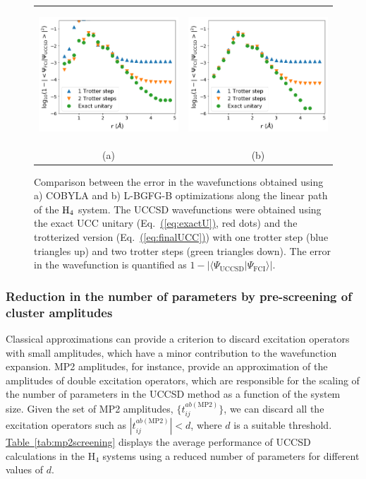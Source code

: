 \documentclass[superscriptaddress,aps,pra,twocolumn,nofootinbib,babel]{revtex4-1}
\newcommand{\eq}[1]{Eq.~\hyperref[eq:#1]{(\ref*{eq:#1})}}
\newcommand{\tab}[1]{\hyperref[tab:#1]{Table~\ref*{tab:#1}}}
\begin{document}
\begin{figure}
\centering
\begin{tabular}{cc}  \includegraphics[height=5cm]{figures/Linear-Trotter-COBYLA.png} & \includegraphics[height=5cm]{figures/Linear-Trotter-LBFGS.png} \\
(a) & (b) \\
\end{tabular}
\caption{Comparison between the error in the wavefunctions obtained using a) COBYLA and b) L-BGFG-B optimizations along the linear path of the $\rm{H}_4$ system. The UCCSD wavefunctions were obtained using the exact UCC unitary (\eq{exactU}, red dots) and the trotterized version (\eq{finalUCC}) with one trotter step (blue triangles up) and two trotter steps (green triangles down). The error in the wavefunction is quantified as $1-|\langle \Psi_{\mathrm{UCCSD}} | \Psi_{\mathrm{FCI}}\rangle|$.}\label{fig:resultstrotterLinear}
\end{figure}

\subsubsection{Reduction in the number of parameters by pre-screening of cluster amplitudes}

Classical approximations can provide a criterion to discard excitation operators with small amplitudes, which have a minor contribution to the wavefunction expansion. MP2 amplitudes, for instance, provide an approximation of the amplitudes of double excitation operators, which are responsible for the scaling of the number of parameters in the  UCCSD method as a function of the system size. Given the set of MP2 amplitudes, $\{t_{ij}^{ab(\mathrm{MP2})}\}$, we can discard all the excitation operators such as $|t_{ij}^{ab(\mathrm{MP2})}|<d$, where $d$ is a suitable threshold. \tab{mp2screening} displays the average performance of UCCSD calculations in the H$_4$ systems using a reduced number of parameters for different values of $d$. 
\end{document}
